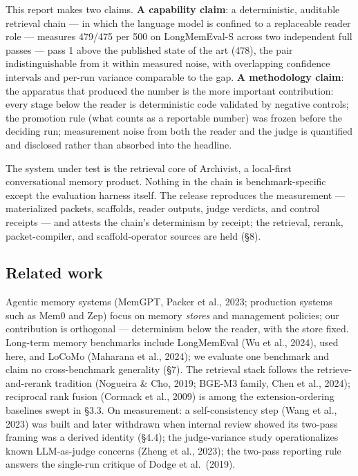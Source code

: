 \documentclass[11pt]{article}
\begin{document}
This report makes two claims. \textbf{A capability claim}: a deterministic,
auditable retrieval chain --- in which the language model is confined to a
replaceable reader role --- measures 479/475 per 500 on LongMemEval-S across
two independent full passes --- pass 1 above the published state of the art
(478), the pair indistinguishable from it within measured noise, with overlapping confidence
intervals and per-run variance comparable to the gap. \textbf{A methodology
claim}: the apparatus that produced the number is the more important
contribution: every stage below the reader is deterministic code validated
by negative controls; the promotion rule (what counts as a reportable
number) was frozen before the deciding run; measurement noise from both the reader and the judge is
quantified and disclosed rather than absorbed into the headline.

The system under test is the retrieval core of Archivist, a local-first
conversational memory product. Nothing in the chain is benchmark-specific
except the evaluation harness itself. The release reproduces the measurement
--- materialized packets, scaffolds, reader outputs, judge verdicts, and control
receipts --- and attests the chain's determinism by receipt; the retrieval,
rerank, packet-compiler, and scaffold-operator sources are held (\S8).

\subsection{Related work}
Agentic memory systems (MemGPT, Packer et al., 2023; production systems such as
Mem0 and Zep) focus on memory \emph{stores} and management policies; our
contribution is orthogonal --- determinism below the reader, with the store
fixed. Long-term memory benchmarks include LongMemEval (Wu et al., 2024), used
here, and LoCoMo (Maharana et al., 2024); we evaluate one benchmark and claim
no cross-benchmark generality (\S7). The retrieval stack follows the
retrieve-and-rerank tradition (Nogueira \& Cho, 2019; BGE-M3 family, Chen et
al., 2024); reciprocal rank fusion (Cormack et al., 2009) is among the
extension-ordering baselines swept in \S3.3. On measurement: a
self-consistency step (Wang et al., 2023) was built and later withdrawn when
internal review showed its two-pass framing was a derived identity (\S4.4); the judge-variance study operationalizes known LLM-as-judge concerns
(Zheng et al., 2023); the two-pass reporting rule answers the single-run
critique of Dodge et al.\ (2019).
\end{document}
